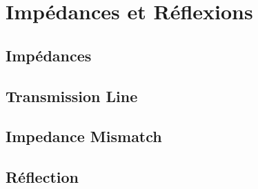 
\section{Impédances et Réflexions}
\subsection{Impédances}
\subsection{Transmission Line}

\subsection{Impedance Mismatch}
\subsection{Réflection}
